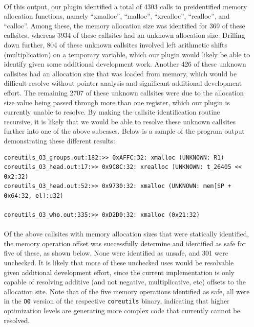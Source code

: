 \documentclass[letterpaper,11pt]{article}
\begin{document}
\paragraph{}
Of this output, our plugin identified a total of 4303 calls to preidentified
memory allocation functions, namely ``xmalloc'', ``malloc'', ``xrealloc'',
``realloc'', and ``calloc''. Among these, the memory allocation size was
identified for 369 of these callsites, whereas 3934 of these callsites had an
unknown allocation size. Drilling down further, 804 of these unknown callsites
involved left arithmetic shifts (multiplication) on a temporary variable, which
our plugin would likely be able to identify given some additional development
work.  Another 426 of these unknown callsites had an allocation size that was
loaded from memory, which would be difficult resolve without pointer analysis
and significant additional development effort. The remaining 2707 of these
unknown callsites were due to the allocation size value being passed through
more than one register, which our plugin is currently unable to resolve. By
making the callsite identification routine recursive, it is likely that we
would be able to resolve these unknown callsites further into one of the above
subcases.  Below is a sample of the program output demonstrating these
different results:

\begin{verbatim}
coreutils_O3_groups.out:182:>> 0xAFFC:32: xmalloc (UNKNOWN: R1)
coreutils_O3_head.out:17:>> 0x9C8C:32: xrealloc (UNKNOWN: t_26405 << 0x2:32)
coreutils_O3_head.out:52:>> 0x9730:32: xmalloc (UNKNOWN: mem[SP + 0x64:32, el]:u32)

coreutils_O3_who.out:335:>> 0xD2D0:32: xmalloc (0x21:32)
\end{verbatim}

\paragraph{}
Of the above callsites with memory allocation sizes that were statically
identified, the memory operation offset was successfully determine and
identified as safe for five of these, as shown below. None were identified as
unsafe, and 301 were unchecked. It is likely that more of these unchecked uses
would be resolvable given additional development effort, since the current
implementation is only capable of resolving additive (and not negative,
multiplicative, etc) offsets to the allocation site. Note that of the five
memory operations identified as safe, all were in the \texttt{O0} version of the
respective \texttt{coreutils} binary, indicating that higher optimization levels are
generating more complex code that currently cannot be resolved.
\end{document}
